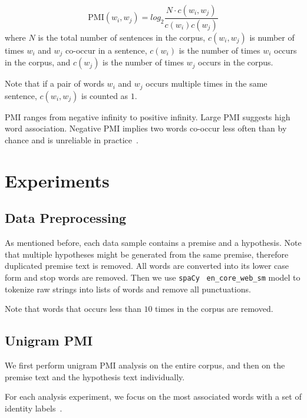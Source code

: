\documentclass[11pt]{article}
\begin{document}
    \[
        \text{PMI}(w_i, w_j) = log_2\frac{N\cdot c(w_i, w_j)}{c(w_i)c(w_j)}
    \]
    where $N$ is the total number of sentences in the corpus,
    $c(w_i,w_j)$ is number of times $w_i$ and $w_j$ co-occur in a sentence,
    $c(w_i)$ is the number of times $w_i$ occurs in the corpus,
    and $c(w_j)$ is the number of times $w_j$ occurs in the corpus.

    Note that if a pair of words $w_i$ and $w_j$ occurs multiple times in the same sentence, $c(w_i,w_j)$ is counted
    as $1$.

    PMI ranges from negative infinity to positive infinity.
    Large PMI suggests high word association.
    Negative PMI implies two words co-occur less often than by chance and is unreliable in
    practice~\cite{speech_and_nlp_book}.


    \section{Experiments}

    \subsection{Data Preprocessing}

    As mentioned before, each data sample contains a premise and a hypothesis.
    Note that multiple hypotheses might be generated from the same premise, therefore duplicated premise text is
    removed.
    All words are converted into its lower case form and stop words are removed.
    Then we use \texttt{spaCy}~\cite{spacy} \texttt{en\_core\_web\_sm} model to tokenize raw strings into
    lists of words and remove all punctuations.

    Note that words that occurs less than $10$ times in the corpus are removed.

    \subsection{Unigram PMI}

    We first perform unigram PMI analysis on the entire corpus, and then on the premise text and the hypothesis text
    individually.

    For each analysis experiment, we focus on the most associated words with a set of
    identity labels~\cite{identity_labels}.
\end{document}
